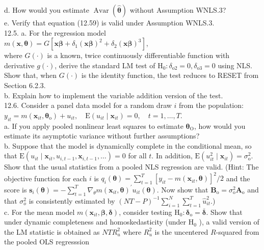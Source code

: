 \documentclass[10pt]{article}
\begin{document}
d. How would you estimate $\operatorname{Avar}(\hat{\boldsymbol{\theta}})$ without Assumption WNLS.3?\\
e. Verify that equation (12.59) is valid under Assumption WNLS.3.\\
12.5. a. For the regression model\\
$m(\mathbf{x}, \boldsymbol{\theta})=G\left[\mathbf{x} \boldsymbol{\beta}+\delta_{1}(\mathbf{x} \boldsymbol{\beta})^{2}+\delta_{2}(\mathbf{x} \boldsymbol{\beta})^{3}\right]$,\\
where $G(\cdot)$ is a known, twice continuously differentiable function with derivative $g(\cdot)$, derive the standard LM test of $\mathrm{H}_{0}: \delta_{\mathrm{o} 2}=0, \delta_{\mathrm{o} 3}=0$ using NLS. Show that, when $G(\cdot)$ is the identity function, the test reduces to RESET from Section 6.2.3.\\
b. Explain how to implement the variable addition version of the test.\\
12.6. Consider a panel data model for a random draw $i$ from the population:\\
$y_{i t}=m\left(\mathbf{x}_{i t}, \boldsymbol{\theta}_{\mathrm{o}}\right)+u_{i t}, \quad \mathrm{E}\left(u_{i t} \mid \mathbf{x}_{i t}\right)=0, \quad t=1, \ldots, T$.\\
a. If you apply pooled nonlinear least squares to estimate $\boldsymbol{\theta}_{\mathrm{O}}$, how would you estimate its asymptotic variance without further assumptions?\\
b. Suppose that the model is dynamically complete in the conditional mean, so that $\mathrm{E}\left(u_{i t} \mid \mathbf{x}_{i t}, u_{i, t-1}, \mathbf{x}_{i, t-1}, \ldots\right)=0$ for all $t$. In addition, $\mathrm{E}\left(u_{i t}^{2} \mid \mathbf{x}_{i t}\right)=\sigma_{\mathrm{o}}^{2}$. Show that the usual statistics from a pooled NLS regression are valid. (Hint: The objective function for each $i$ is $q_{i}(\boldsymbol{\theta})=\sum_{t=1}^{T}\left[y_{i t}-m\left(\mathbf{x}_{i t}, \boldsymbol{\theta}\right)\right]^{2} / 2$ and the score is $\mathbf{s}_{i}(\boldsymbol{\theta})= -\sum_{t=1}^{T} \nabla_{\theta} m\left(\mathbf{x}_{i t}, \boldsymbol{\theta}\right)^{\prime} u_{i t}(\boldsymbol{\theta})$. Now show that $\mathbf{B}_{\mathrm{o}}=\sigma_{\mathrm{o}}^{2} \mathbf{A}_{\mathrm{o}}$ and that $\sigma_{o}^{2}$ is consistently estimated by $(N T-P)^{-1} \sum_{i=1}^{N} \sum_{t=1}^{T} \hat{u}_{i t}^{2}$.)\\
c. For the mean model $m\left(\mathbf{x}_{i t}, \boldsymbol{\beta}, \boldsymbol{\delta}\right)$, consider testing $\mathrm{H}_{0}: \boldsymbol{\delta}_{\mathrm{o}}=\overline{\boldsymbol{\delta}}$. Show that under dynamic completeness and homoskedasticity (under $\mathrm{H}_{0}$ ), a valid version of the LM statistic is obtained as $N T R_{u}^{2}$ where $R_{u}^{2}$ is the uncentered $R$-squared from the pooled OLS regresssion\\
\end{document}
